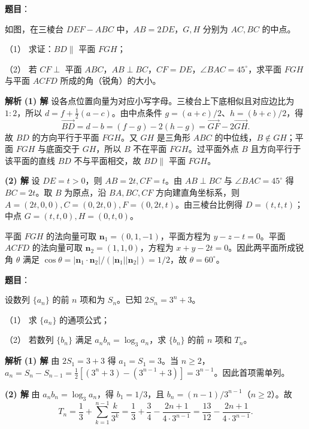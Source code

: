 \begin{answer}

\textbf{题目}：

如图，在三棱台 $DEF-ABC$ 中，$AB=2DE$，$G,H$ 分别为 $AC,BC$ 的中点。
\nopagebreak[4]
\begin{center}\end{center}
\nopagebreak[4]
（1） 求证：$BD\parallel$ 平面 $FGH$；

（2） 若 $CF\perp$ 平面 $ABC$，$AB\perp BC$，$CF=DE$，$\angle BAC=45^\circ$，求平面 $FGH$ 与平面 $ACFD$ 所成的角（锐角）的大小。

\textbf{解析}
\textbf{(1) 解}
设各点位置向量为对应小写字母。三棱台上下底相似且对应边比为 $1:2$，所以 $d=f+\tfrac12(a-c)$。由中点条件 $g=(a+c)/2$、$h=(b+c)/2$，得
\nopagebreak[4]
\[
\overrightarrow{BD}=d-b=(f-g)-2(h-g)=\overrightarrow{GF}-2\overrightarrow{GH}.
\]
故 $BD$ 的方向平行于平面 $FGH$。又 $GH$ 是三角形 $ABC$ 的中位线，$B\notin GH$；平面 $FGH$ 与底面交于 $GH$，所以 $B$ 不在平面 $FGH$。过平面外点 $B$ 且方向平行于该平面的直线 $BD$ 不与平面相交，故 $BD\parallel$ 平面 $FGH$。

\textbf{(2) 解}
设 $DE=t>0$，则 $AB=2t,CF=t$。由 $AB\perp BC$ 与 $\angle BAC=45^\circ$ 得 $BC=2t$。取 $B$ 为原点，沿 $BA,BC,CF$ 方向建直角坐标系，则 $A=(2t,0,0),C=(0,2t,0),F=(0,2t,t)$。由三棱台比例得 $D=(t,t,t)$；中点 $G=(t,t,0),H=(0,t,0)$。

平面 $FGH$ 的法向量可取 $\mathbf n_1=(0,1,-1)$，平面方程为 $y-z-t=0$。平面 $ACFD$ 的法向量可取 $\mathbf n_2=(1,1,0)$，方程为 $x+y-2t=0$。因此两平面所成锐角 $\theta$ 满足 $\cos\theta=|\mathbf n_1\cdot\mathbf n_2|/(|\mathbf n_1||\mathbf n_2|)=1/2$，故 $\theta=60^\circ$。



\end{answer}
\begin{answer}

\textbf{题目}：

设数列 $\{a_n\}$ 的前 $n$ 项和为 $S_n$。已知 $2S_n=3^n+3$。

（1） 求 $\{a_n\}$ 的通项公式；

（2） 若数列 $\{b_n\}$ 满足 $a_nb_n=\log_3 a_n$，求 $\{b_n\}$ 的前 $n$ 项和 $T_n$。

\textbf{解析}
\textbf{(1) 解}
由 $2S_1=3+3$ 得 $a_1=S_1=3$。当 $n\ge2$，$a_n=S_n-S_{n-1}=\tfrac12[(3^n+3)-(3^{n-1}+3)]=3^{n-1}$。因此首项需单列。

\textbf{(2) 解}
由 $a_nb_n=\log_3a_n$，得 $b_1=1/3$，且 $b_n=(n-1)/3^{n-1}$（$n\ge2$）。故
\nopagebreak[4]
\[
T_n=\frac13+\sum_{k=1}^{n-1}\frac{k}{3^k}
=\frac13+\frac34-\frac{2n+1}{4\cdot3^{n-1}}
=\frac{13}{12}-\frac{2n+1}{4\cdot3^{n-1}}.
\]



\end{answer}
